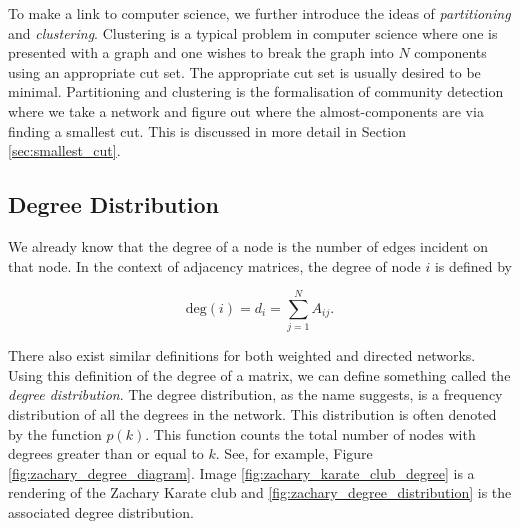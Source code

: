 To make a link to computer science, we further introduce the ideas of \emph{partitioning} and \emph{clustering}. Clustering is a typical problem in computer science where one is presented with a graph and one wishes to break the graph into $N$ components using an appropriate cut set. The appropriate cut set is usually desired to be minimal. Partitioning and clustering is the formalisation of community detection where we take a network and figure out where the almost-components are via finding a smallest cut. This is discussed in more detail in Section \ref{sec:smallest_cut}.

\subsection{Degree Distribution}\label{sec:Degree Distribution}
We already know that the degree of a node is the number of edges incident on that node. In the context of adjacency matrices, the degree of node $i$ is defined by 

$$
\text{deg}(i) = d_i = \sum_{j=1}^NA_{ij}.
$$

There also exist similar definitions for both weighted and directed networks. Using this definition of the degree of a matrix, we can define something called the \emph{degree distribution}. The degree distribution, as the name suggests, is a frequency distribution of all the degrees in the network. This distribution is often denoted by the function $p(k)$. This function counts the total number of nodes with degrees greater than or equal to $k$. See, for example, Figure \ref{fig:zachary_degree_diagram}. Image \ref{fig:zachary_karate_club_degree} is a rendering of the Zachary Karate club and \ref{fig:zachary_degree_distribution} is the associated degree distribution.

